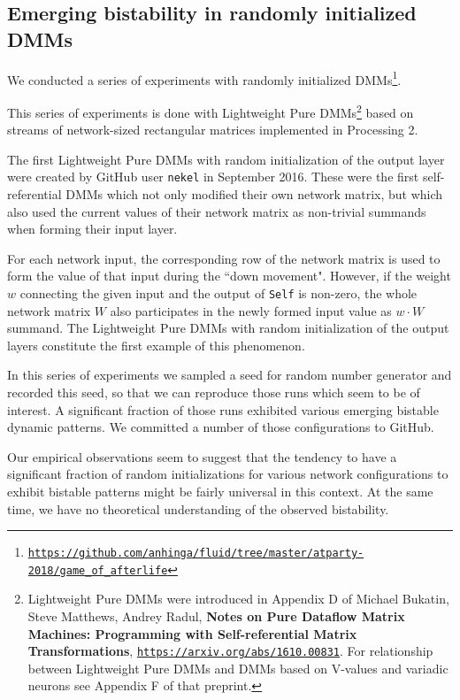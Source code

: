 \documentclass{article}
\begin{document}
\subsection{Emerging bistability in randomly initialized DMMs}

We conducted a series of experiments with randomly initialized DMMs\footnote{\href{https://github.com/anhinga/fluid/tree/master/atparty-2018/game\_of\_afterlife}
{\tt https://github.com/anhinga/fluid/tree/master/atparty-2018/game\_of\_afterlife}}.

This series of experiments is done with Lightweight Pure DMMs\footnote{Lightweight
Pure DMMs were introduced in Appendix D of Michael Bukatin, Steve Matthews, Andrey Radul, {\bf Notes on Pure Dataflow Matrix Machines: 
Programming with Self-referential Matrix Transformations}, \href{https://arxiv.org/abs/1610.00831}{\tt https://arxiv.org/abs/1610.00831}. 
For relationship between Lightweight Pure DMMs and DMMs based on V-values and variadic neurons see Appendix F of that preprint.} 
based on streams of network-sized rectangular matrices implemented in 
Processing 2.

The first Lightweight Pure DMMs with random initialization of the output layer were created by GitHub user {\tt nekel} in September 2016.
These were the first self-referential DMMs which not only modified their own network matrix, but which also used the current values of
their network matrix as non-trivial summands when forming their input layer. 

For each network input, the corresponding row of the network matrix is used to form the value of that input during the ``down movement".
However, if the weight $w$ connecting the given input and the output of {\tt Self} is non-zero, the whole network matrix $W$ also participates in the
newly formed input value as $w\cdot W$ summand. The Lightweight Pure DMMs with random initialization of the output layers constitute the first example
of this phenomenon. 

In this series of experiments we sampled a seed for random number generator and recorded this seed, so that we can reproduce
those runs which seem to be of interest. A significant fraction of those runs exhibited various emerging bistable dynamic patterns.
We committed a number of those configurations to GitHub.

Our empirical observations seem to suggest that the tendency to have a significant fraction of random initializations for various
network configurations to exhibit bistable patterns might be fairly universal in this context. At the same time, we have no
theoretical understanding of the observed bistability. 
\end{document}
